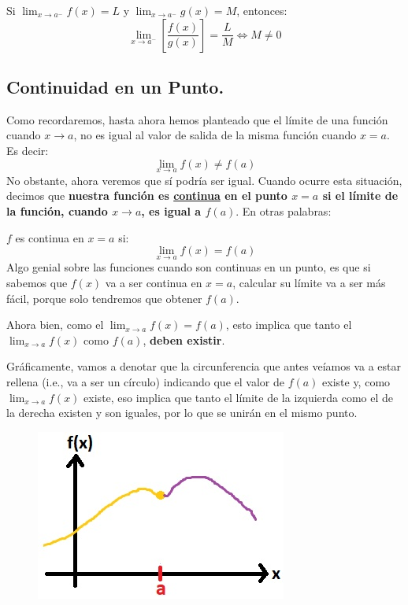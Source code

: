 \documentclass[12pt]{article}
\begin{document}
Si $\lim_{x \to a^{-}} f(x) = L$ y $\lim_{x \to a^{-}} g(x) = M$, entonces:
\[\lim_{x \to a^{-}} \left[\frac{f(x)}{g(x)}\right] = \frac{L}{M} \iff M \neq 0\]

\newpage


\subsection{Continuidad en un Punto.}

Como recordaremos, hasta ahora hemos planteado que el límite de una función cuando $x \to a$, no es igual al valor de salida de la misma función cuando $x = a$. Es decir:
\[\lim_{x \to a} f(x) \neq f(a)\]
No obstante, ahora veremos que sí podría ser igual. Cuando ocurre esta situación, decimos que \textbf{nuestra función es \underline{continua} en el punto $x = a$ si el límite de la función, cuando $x \to a$, es igual a $f(a)$}. En otras palabras:

$f$ es continua en $x = a$ si:
\[\lim_{x \to a} f(x) = f(a)\]
Algo genial sobre las funciones cuando son continuas en un punto, es que si sabemos que $f(x)$ va a ser continua en $x = a$, calcular su límite va a ser más fácil, porque solo tendremos que obtener $f(a)$.

Ahora bien, como el $\lim_{x \to a} f(x) = f(a)$, esto implica que tanto el $\lim_{x \to a} f(x)$ como $f(a)$, \textbf{deben existir}. 

Gráficamente, vamos a denotar que la circunferencia que antes veíamos va a estar rellena (i.e., va a ser un círculo) indicando que el valor de $f(a)$ existe y, como $\lim_{x \to a} f(x)$ existe, eso implica que tanto el límite de la izquierda como el de la derecha existen y son iguales, por lo que se unirán en el mismo punto.

\newpage

\begin{figure}[hbt!]
\centering
\includegraphics[scale=0.7]{img/continuity_plot.jpg}
\end{figure}
\end{document}
